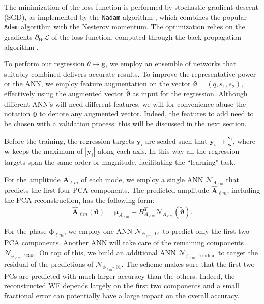 \documentclass[twocolumn,showpacs,preprintnumbers,nofootinbib,prd,
superscriptaddress,10pt]{revtex4-1}
\begin{document}
The minimization of the loss function is performed by stochastic gradient descent (SGD), as implemented by the \texttt{Nadam} algorithm \cite{dozat.2016}, which combines the popular \texttt{Adam} algorithm \cite{Kingma2014AdamAM} with the Nesterov momentum. The optimization relies on the gradients $\partial_W \mathcal{L}$ of the loss function, computed through the 
back-propagation algorithm \cite{backprop}.

To perform our regression $\theta \longmapsto \boldsymbol{g}$, we employ an ensemble of networks that suitably combined delivers accurate results.
To improve the representative power or the ANN, we employ feature augmentation on the vector $\boldsymbol{\vartheta} = (q, s_1, s_2)$, effectively using the augmented vector $\tilde{\boldsymbol{\vartheta}}$ as input for the regression. Although different ANN's will need different features, we will for convenience 
abuse the notation $\tilde{\boldsymbol{\vartheta}}$ to denote any augmented vector. Indeed, the features to add need to be chosen with a validation process: this will be discussed in the next section.

Before the training, the regression targets $\boldsymbol{y}_i$ are scaled such that $\boldsymbol{y}_i \rightarrow \frac{\boldsymbol{y}_i}{\boldsymbol{w}}$, where $\boldsymbol{w}$ keeps the maximum of $|\boldsymbol{y}_i|$ along each axis. %
In this way all the regression targets span the same order or magnitude, facilitating the ``learning" task.

For the amplitude $\boldsymbol{A}_{\ell m}$ of each mode, we employ a single ANN $\mathcal{N}_{A_{\ell m}}$ that predicts the first four PCA components.
The predicted amplitude $\hat{\boldsymbol{A}}_{\ell m}$, including the PCA reconstruction, has the following form:
\begin{equation}\label{eq:amp_pred}
	\hat{\boldsymbol{A}}_{\ell m}(\boldsymbol{\vartheta}) = \boldsymbol{\mu}_{A_{\ell m}} + H_{A_{\ell m}}^T \mathcal{N}_{A_{\ell m}}(\tilde{\boldsymbol{\vartheta}}).
\end{equation}

For the phase $\boldsymbol{\phi}_{\ell m}$, we employ one ANN $\mathcal{N}_{\phi_{\ell m}\text{- 01}}$ to predict only the first two PCA components.
Another ANN will take care of the remaining components $\mathcal{N}_{\phi_{\ell m}\text{- 2345}}$.
On top of this, we build an additional ANN $\mathcal{N}_{\phi_{\ell m}\text{- residual}}$ to target the residual of the predictions of $\mathcal{N}_{\phi_{\ell m}\text{- 01}}$.
The scheme makes sure that the first two PCs are predicted with much larger accuracy than the others. Indeed, the reconstructed WF depends largely on the first two components and a small fractional error can potentially have a large impact on the overall accuracy.
\end{document}
